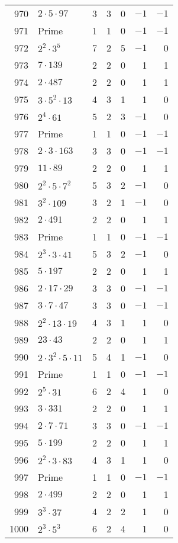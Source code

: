 \documentclass[12pt]{article}
\begin{document}
\begin{tabular}{|r|l|r|r|r|r|r|}
970 & $2 \cdot 5 \cdot 97$ & 3 & 3 & 0 & $-1$ & $-1$ \\
971 & Prime & 1 & 1 & 0 & $-1$ & $-1$ \\
972 & $2^2 \cdot 3^5$ & 7 & 2 & 5 & $-1$ & 0 \\
973 & $7 \cdot 139$ & 2 & 2 & 0 & 1 & 1 \\
974 & $2 \cdot 487$ & 2 & 2 & 0 & 1 & 1 \\
975 & $3 \cdot 5^2 \cdot 13$ & 4 & 3 & 1 & 1 & 0 \\
976 & $2^4 \cdot 61$ & 5 & 2 & 3 & $-1$ & 0 \\
977 & Prime & 1 & 1 & 0 & $-1$ & $-1$ \\
978 & $2 \cdot 3 \cdot 163$ & 3 & 3 & 0 & $-1$ & $-1$ \\
979 & $11 \cdot 89$ & 2 & 2 & 0 & 1 & 1 \\
980 & $2^2 \cdot 5 \cdot 7^2$ & 5 & 3 & 2 & $-1$ & 0 \\
981 & $3^2 \cdot 109$ & 3 & 2 & 1 & $-1$ & 0 \\
982 & $2 \cdot 491$ & 2 & 2 & 0 & 1 & 1 \\
983 & Prime & 1 & 1 & 0 & $-1$ & $-1$ \\
984 & $2^3 \cdot 3 \cdot 41$ & 5 & 3 & 2 & $-1$ & 0 \\
985 & $5 \cdot 197$ & 2 & 2 & 0 & 1 & 1 \\
986 & $2 \cdot 17 \cdot 29$ & 3 & 3 & 0 & $-1$ & $-1$ \\
987 & $3 \cdot 7 \cdot 47$ & 3 & 3 & 0 & $-1$ & $-1$ \\
988 & $2^2 \cdot 13 \cdot 19$ & 4 & 3 & 1 & 1 & 0 \\
989 & $23 \cdot 43$ & 2 & 2 & 0 & 1 & 1 \\
990 & $2 \cdot 3^2 \cdot 5 \cdot 11$ & 5 & 4 & 1 & $-1$ & 0 \\
991 & Prime & 1 & 1 & 0 & $-1$ & $-1$ \\
992 & $2^5 \cdot 31$ & 6 & 2 & 4 & 1 & 0 \\
993 & $3 \cdot 331$ & 2 & 2 & 0 & 1 & 1 \\
994 & $2 \cdot 7 \cdot 71$ & 3 & 3 & 0 & $-1$ & $-1$ \\
995 & $5 \cdot 199$ & 2 & 2 & 0 & 1 & 1 \\
996 & $2^2 \cdot 3 \cdot 83$ & 4 & 3 & 1 & 1 & 0 \\
997 & Prime & 1 & 1 & 0 & $-1$ & $-1$ \\
998 & $2 \cdot 499$ & 2 & 2 & 0 & 1 & 1 \\
999 & $3^3 \cdot 37$ & 4 & 2 & 2 & 1 & 0 \\
1000 & $2^3 \cdot 5^3$ & 6 & 2 & 4 & 1 & 0 \\
\end{tabular}
\end{document}
